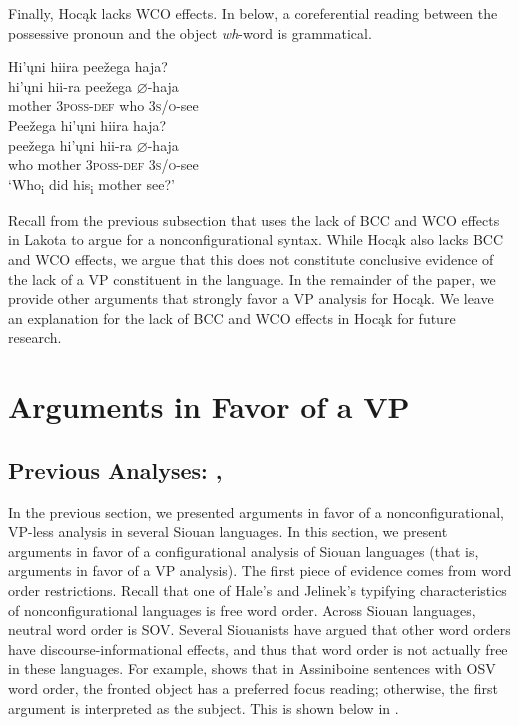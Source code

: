 \documentclass[output=paper]{LSP/langsci}
\begin{document}
Finally, Hocąk lacks WCO effects. In  below, a coreferential reading between the possessive pronoun and the object \textit{wh}-word is grammatical.

\begin{exe}
\ex
\begin{xlist}
\ex	
\glll Hi'\k{u}ni		hiira					pee\v{z}ega		haja? \\
hi'\k{u}ni		hii-ra 			pee\v{z}ega		$\varnothing$-haja \\
	mother		3\textsc{poss-def}		who	\textsc{3s/o}-see \\
\ex 
\glll Pee\v{z}ega 	hi'\k{u}ni 		hiira		haja?\\
pee\v{z}ega 	hi'\k{u}ni 		hii-ra 		$\varnothing$-haja \\
	who 	mother 	3\textsc{poss-def} 	\textsc{3s/o}-see \\
\trans `Who\textsubscript{i} did his\textsubscript{i} mother see?'
\end{xlist}
\end{exe}

Recall from the previous subsection that \citet{VanValin1985,VanValin1987} uses the lack of BCC and WCO effects in Lakota to argue for a nonconfigurational syntax. While Hocąk also lacks BCC and WCO effects, we argue that this does not constitute conclusive evidence of the lack of a VP constituent in the language. In the remainder of the paper, we provide other arguments that strongly favor a VP analysis for Hocąk. We leave an explanation for the lack of BCC and WCO effects in Hocąk for future research.

\section{Arguments in Favor of a VP}

\subsection{Previous Analyses: \citet{Boyle2007}, \citet{Graczyk1991} \citet{West2003}}

In the previous section, we presented arguments in favor of a nonconfigurational, VP-less analysis in several Siouan languages.  In this section, we present arguments in favor of a configurational analysis of Siouan languages (that is, arguments in favor of a VP analysis).  The first piece of evidence comes from word order restrictions. Recall that one of Hale's  and Jelinek's  typifying characteristics of nonconfigurational languages is free word order.  Across Siouan languages, neutral word order is SOV.  Several Siouanists have argued that other word orders have discourse-informational effects, and thus that word order is not actually free in these languages. For example, \citet{West2003} shows that in Assiniboine sentences with OSV word order, the fronted object has a preferred focus reading; otherwise, the first argument is interpreted as the subject. This is shown below in . 
\end{document}
